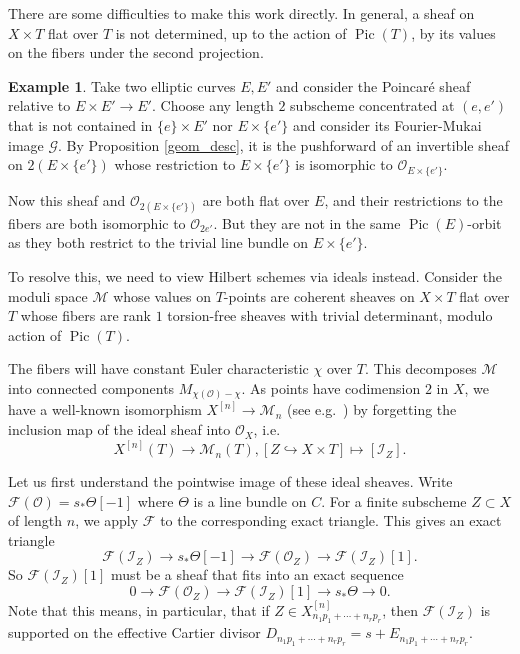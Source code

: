 \documentclass{amsart}
\theoremstyle{plain}
\theoremstyle{definition}
\newtheorem{example}[theorem]{Example}
\theoremstyle{remark}
\begin{document}
    There are some difficulties to make this work directly.
    In general, a sheaf on $X\times T$ flat over $T$ is not determined, up to the action of $\operatorname{Pic}(T)$, by its values on the fibers under the second projection.
    \begin{example}
        Take two elliptic curves $E,E'$ and consider the Poincar\'e sheaf relative to $E\times E'\to E'$.
        Choose any length $2$ subscheme concentrated at $(e,e')$ that is not contained in $\{e\}\times E'$ nor $E\times\{e'\}$ and consider its Fourier-Mukai image $\mathcal G$.
        By Proposition \ref{geom_desc}, it is the pushforward of an invertible sheaf on $2(E\times \{e'\})$ whose restriction to $E\times \{e'\}$ is isomorphic to $\mathcal O_{E\times \{e'\}}$.

        Now this sheaf and $\mathcal O_{2(E\times \{e'\})}$ are both flat over $E$, and their restrictions to the fibers are both isomorphic to $\mathcal O_{2e'}$.
        But they are not in the same $\operatorname{Pic}(E)$-orbit as they both restrict to the trivial line bundle on $E\times \{e'\}$.
    \end{example}
    To resolve this, we need to view Hilbert schemes via ideals instead.
    Consider the moduli space $\mathcal M$ whose values on $T$-points are coherent sheaves on $X\times T$ flat over $T$ whose fibers are rank $1$ torsion-free sheaves with trivial determinant, modulo action of $\operatorname{Pic}(T)$.

    The fibers will have constant Euler characteristic $\chi$ over $T$.
    This decomposes $\mathcal M$ into connected components $M_{\chi(\mathcal O)-\chi}$.
    As points have codimension $2$ in $X$, we have a well-known isomorphism $X^{[n]}\to\mathcal M_n$ (see e.g.~\cite[Example 4.3.6]{Huybrechts_Lehn}) by forgetting the inclusion map of the ideal sheaf into $\mathcal O_X$, i.e.
    \[
    X^{[n]}(T)\to \mathcal M_n(T),[Z\hookrightarrow X\times T]\mapsto [\mathcal I_Z].
    \]

    Let us first understand the pointwise image of these ideal sheaves.
    Write $\mathcal F(\mathcal O)=s_\ast\Theta[-1]$ where $\Theta$ is a line bundle on $C$.
    For a finite subscheme $Z\subset X$ of length $n$, we apply $\mathcal F$ to the corresponding exact triangle.
    This gives an exact triangle
    \[\mathcal F(\mathcal I_Z)\to s_\ast\Theta[-1]\to\mathcal F(\mathcal O_Z)\to\mathcal F(\mathcal I_Z)[1].\]
    So $\mathcal F(\mathcal I_Z)[1]$ must be a sheaf that fits into an exact sequence
    \[0\to \mathcal F(\mathcal O_Z)\to \mathcal F(\mathcal I_Z)[1]\to s_\ast\Theta\to 0.\]
    Note that this means, in particular, that if $Z\in X^{[n]}_{n_1p_1+\cdots+n_rp_r}$, then $\mathcal F(\mathcal I_Z)$ is supported on the effective Cartier divisor $D_{n_1p_1+\cdots+n_rp_r}=s+E_{n_1p_1+\cdots+n_rp_r}$.
\end{document}
